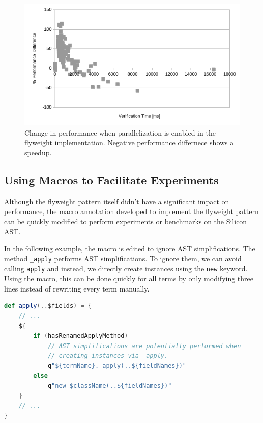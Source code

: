 \documentclass[11pt]{article}
\begin{document}
    \begin{figure}[H]
        \includegraphics[width=\linewidth]{parallelization-flyweight.png}
        \caption{Change in performance when parallelization is enabled in the flyweight implementation. Negative performance differnece shows a speedup.}
        \label{fig:parallelization-flyweight}
    \end{figure}


    \subsection{Using Macros to Facilitate Experiments}

    Although the flyweight pattern itself didn't have a significant impact on performance,
    the macro annotation developed to implement the flyweight pattern can
    be quickly modified to perform experiments or benchmarks on the Silicon AST.

    In the following example, the macro is edited to ignore AST simplifications.
    The method \texttt{\_apply} performs AST simplifications. To ignore 
    them, we can avoid calling \texttt{apply} and instead,
    we directly create instances using the \texttt{new} keyword.
    Using the macro, this can be done quickly for all terms by only modifying three lines
    instead of rewriting every term manually.

    \begin{lstlisting}[language=Scala, caption=Use AST simplifications as normal.]
def apply(..$fields) = {
    // ...
    ${
        if (hasRenamedApplyMethod)
            // AST simplifications are potentially performed when
            // creating instances via _apply.
            q"${termName}._apply(..${fieldNames})"
        else
            q"new $className(..${fieldNames})"
    }
    // ...
}  
    \end{lstlisting}
\end{document}

